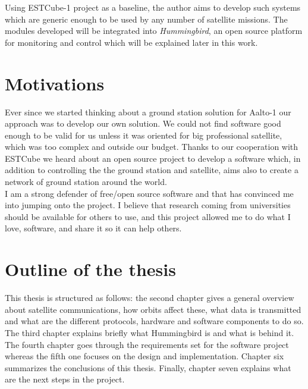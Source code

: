 Using ESTCube-1 project as a baseline, the author aims to develop such systems which are generic enough to be used by any number of satellite missions. The modules developed will be integrated into \emph{Hummingbird}, an open source platform for monitoring and control which will be explained later in this work. 


\pagebreak


\section{Motivations}

Ever since we started thinking about a ground station solution for Aalto-1 our approach was to develop our own solution. We could not find software good enough to be valid for us unless it was oriented for big professional satellite, which was too complex and outside our budget. Thanks to our cooperation with ESTCube we heard about an open source project to develop a software which, in addition to controlling the the ground station and satellite, aims also to create a network of ground station around the world.\\

I am a strong defender of free/open source software and that has convinced me into jumping onto the project. I believe that research coming from universities should be available for others to use, and this project allowed me to do what I love, software, and share it so it can help others.\\



\section{Outline of the thesis}
This thesis is structured as follows: the second chapter gives a general overview about satellite communications, how orbits affect these, what data is transmitted and what are the different protocols, hardware and software components to do so. The third chapter explains briefly what Hummingbird is and what is behind it. The fourth chapter goes through the requirements set for the software project whereas the fifth one focuses on the design and implementation. Chapter six summarizes the conclusions of this thesis. Finally, chapter seven explains what are the next steps in the project.

\newpage
